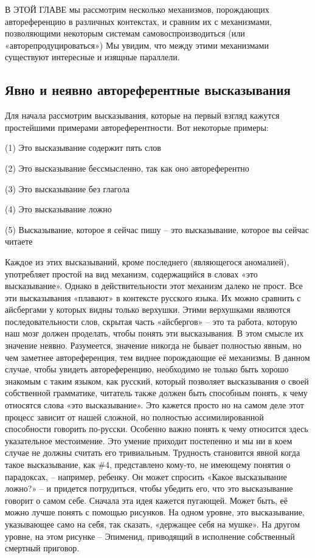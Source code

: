 \documentclass[../main.tex]{subfiles}
\begin{document}

В ЭТОЙ ГЛАВЕ мы рассмотрим несколько механизмов, порождающих автореференцию в различных контекстах, и сравним их с механизмами, позволяющими некоторым системам самовоспроизводиться (или «авторепродуцироваться») Мы увидим, что между этими механизмами существуют интересные и изящные параллели.


\subsection{Явно и неявно автореферентные высказывания}

Для начала рассмотрим высказывания, которые на первый взгляд кажутся простейшими примерами автореферентности. Вот некоторые примеры:

(1) Это высказывание содержит пять слов

(2) Это высказывание бессмысленно, так как оно автореферентно

(3) Это высказывание без глагола

(4) Это высказывание ложно

(5) Высказывание, которое я сейчас пишу \--- это высказывание, которое вы сейчас читаете

Каждое из этих высказываний, кроме последнего (являющегося аномалией), употребляет простой на вид механизм, содержащийся в словах «это высказывание». Однако в действительности этот механизм далеко не прост. Все эти высказывания «плавают» в контексте русского языка. Их можно сравнить с айсбергами у которых видны только верхушки. Этими верхушками являются последовательности слов, скрытая часть «айсбергов» \--- это та работа, которую наш мозг должен проделать, чтобы понять эти высказывания. В этом смысле их значение неявно. Разумеется, значение никогда не бывает полностью явным, но чем заметнее автореференция, тем виднее порождающие её механизмы. В данном случае, чтобы увидеть автореференцию, необходимо не только быть хорошо знакомым с таким языком, как русский, который позволяет высказывания о своей собственной грамматике, читатель также должен быть способным понять, к чему относятся слова «это высказывание». Это кажется просто но на самом деле этот процесс зависит от нашей сложной, но полностью ассимилированной способности говорить по-русски. Особенно важно понять к чему относится здесь указательное местоимение. Это умение приходит постепенно и мы ни в коем случае не должны считать его тривиальным. Трудность становится явной когда такое высказывание, как \#4, представлено кому-то, не имеющему понятия о парадоксах, \--- например, ребенку. Он может спросить «Какое высказывание ложно?» \--- и придется потрудиться, чтобы убедить его, что это высказывание говорит о самом себе. Сначала эта идея кажется пугающей. Может быть, её можно лучше понять с помощью рисунков. На одном уровне, это высказывание, указывающее само на себя, так сказать, «держащее себя на мушке». На другом уровне, на этом рисунке \--- Эпименид, приводящий в исполнение собственный смертный приговор.
\end{document}
